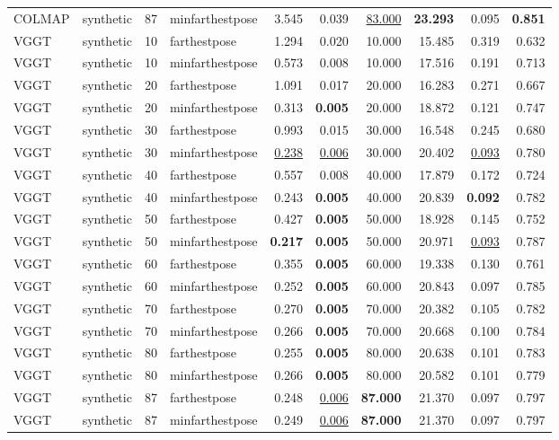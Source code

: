 \begin{table}[H]
\begin{tabular}{llrlrrrrrr}
COLMAP & synthetic & 87 & minfarthestpose & 3.545 & 0.039 & \underline{83.000} & \textbf{23.293} & 0.095 & \textbf{0.851} \\
VGGT & synthetic & 10 & farthestpose & 1.294 & 0.020 & 10.000 & 15.485 & 0.319 & 0.632 \\
VGGT & synthetic & 10 & minfarthestpose & 0.573 & 0.008 & 10.000 & 17.516 & 0.191 & 0.713 \\
VGGT & synthetic & 20 & farthestpose & 1.091 & 0.017 & 20.000 & 16.283 & 0.271 & 0.667 \\
VGGT & synthetic & 20 & minfarthestpose & 0.313 & \textbf{0.005} & 20.000 & 18.872 & 0.121 & 0.747 \\
VGGT & synthetic & 30 & farthestpose & 0.993 & 0.015 & 30.000 & 16.548 & 0.245 & 0.680 \\
VGGT & synthetic & 30 & minfarthestpose & \underline{0.238} & \underline{0.006} & 30.000 & 20.402 & \underline{0.093} & 0.780 \\
VGGT & synthetic & 40 & farthestpose & 0.557 & 0.008 & 40.000 & 17.879 & 0.172 & 0.724 \\
VGGT & synthetic & 40 & minfarthestpose & 0.243 & \textbf{0.005} & 40.000 & 20.839 & \textbf{0.092} & 0.782 \\
VGGT & synthetic & 50 & farthestpose & 0.427 & \textbf{0.005} & 50.000 & 18.928 & 0.145 & 0.752 \\
VGGT & synthetic & 50 & minfarthestpose & \textbf{0.217} & \textbf{0.005} & 50.000 & 20.971 & \underline{0.093} & 0.787 \\
VGGT & synthetic & 60 & farthestpose & 0.355 & \textbf{0.005} & 60.000 & 19.338 & 0.130 & 0.761 \\
VGGT & synthetic & 60 & minfarthestpose & 0.252 & \textbf{0.005} & 60.000 & 20.843 & 0.097 & 0.785 \\
VGGT & synthetic & 70 & farthestpose & 0.270 & \textbf{0.005} & 70.000 & 20.382 & 0.105 & 0.782 \\
VGGT & synthetic & 70 & minfarthestpose & 0.266 & \textbf{0.005} & 70.000 & 20.668 & 0.100 & 0.784 \\
VGGT & synthetic & 80 & farthestpose & 0.255 & \textbf{0.005} & 80.000 & 20.638 & 0.101 & 0.783 \\
VGGT & synthetic & 80 & minfarthestpose & 0.266 & \textbf{0.005} & 80.000 & 20.582 & 0.101 & 0.779 \\
VGGT & synthetic & 87 & farthestpose & 0.248 & \underline{0.006} & \textbf{87.000} & 21.370 & 0.097 & 0.797 \\
VGGT & synthetic & 87 & minfarthestpose & 0.249 & \underline{0.006} & \textbf{87.000} & 21.370 & 0.097 & 0.797 \\
\bottomrule
\end{tabular}
\end{table}